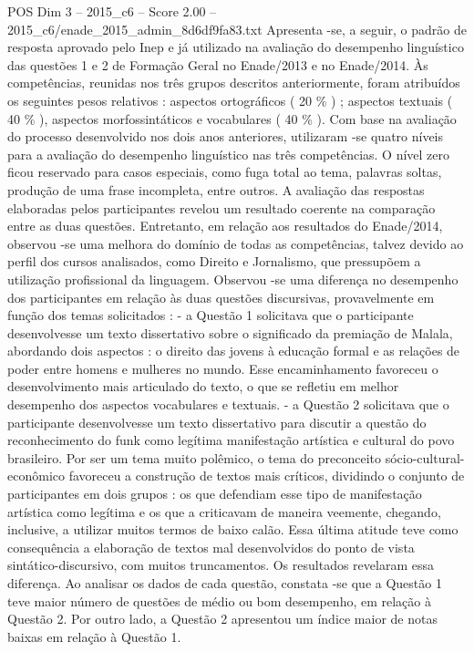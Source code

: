 \begin{textsample}{POS Dim 3 – 2015\_c6 – Score 2.00 – 2015\_c6/enade\_2015\_admin\_8d6df9fa83.txt}
Apresenta -se, a seguir, o padrão de resposta aprovado pelo Inep e já utilizado na avaliação do desempenho linguístico das questões 1 e 2 de Formação Geral no Enade/2013 e no Enade/2014.
Às competências, reunidas nos três grupos descritos anteriormente, foram atribuídos os seguintes pesos relativos : aspectos ortográficos ( 20 \% ) ; aspectos textuais ( 40 \% ), aspectos morfossintáticos e vocabulares ( 40 \% ).
Com base na avaliação do processo desenvolvido nos dois anos anteriores, utilizaram -se quatro níveis para a avaliação do desempenho linguístico nas três competências.
O nível zero ficou reservado para casos especiais, como fuga total ao tema, palavras soltas, produção de uma frase incompleta, entre outros.
A avaliação das respostas elaboradas pelos participantes revelou um resultado coerente na comparação entre as duas questões.
Entretanto, em relação aos resultados do Enade/2014, observou -se uma melhora do domínio de todas as competências, talvez devido ao perfil dos cursos analisados, como Direito e Jornalismo, que pressupõem a utilização profissional da linguagem.
Observou -se uma diferença no desempenho dos participantes em relação às duas questões discursivas, provavelmente em função dos temas solicitados : - a Questão 1 solicitava que o participante desenvolvesse um texto dissertativo sobre o significado da premiação de Malala, abordando dois aspectos : o direito das jovens à educação formal e as relações de poder entre homens e mulheres no mundo.
Esse encaminhamento favoreceu o desenvolvimento mais articulado do texto, o que se refletiu em melhor desempenho dos aspectos vocabulares e textuais. - a Questão 2 solicitava que o participante desenvolvesse um texto dissertativo para discutir a questão do reconhecimento do funk como legítima manifestação artística e cultural do povo brasileiro.
Por ser um tema muito polêmico, o tema do preconceito sócio-cultural-econômico favoreceu a construção de textos mais críticos, dividindo o conjunto de participantes em dois grupos : os que defendiam esse tipo de manifestação artística como legítima e os que a criticavam de maneira veemente, chegando, inclusive, a utilizar muitos termos de baixo calão.
Essa última atitude teve como consequência a elaboração de textos mal desenvolvidos do ponto de vista sintático-discursivo, com muitos truncamentos.
Os resultados revelaram essa diferença.
Ao analisar os dados de cada questão, constata -se que a Questão 1 teve maior número de questões de médio ou bom desempenho, em relação à Questão 2.
Por outro lado, a Questão 2 apresentou um índice maior de notas baixas em relação à Questão 1.

\end{textsample}
